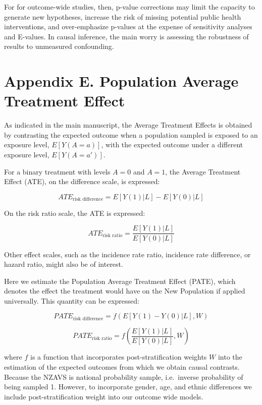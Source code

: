 \documentclass[
  singlecolumn]{report}
\begin{document}
For for outcome-wide studies, then, p-value corrections may limit the
capacity to generate new hypotheses, increase the risk of missing
potential public health interventions, and over-emphasize p-values at
the expense of sensitivity analyses and E-values. In causal inference,
the main worry is assessing the robustness of results to unmeasured
confounding.

\newpage{}

\hypertarget{appendix-e.-population-average-treatment-effect}{%
\section{Appendix E. Population Average Treatment
Effect}\label{appendix-e.-population-average-treatment-effect}}

As indicated in the main manuscript, the Average Treatment Effects is
obtained by contrasting the expected outcome when a population sampled
is exposed to an exposure level, \(E[Y(A = a)]\), with the expected
outcome under a different exposure level, \(E[Y(A=a')]\).

For a binary treatment with levels \(A=0\) and \(A=1\), the Average
Treatment Effect (ATE), on the difference scale, is expressed:

\[ATE_{\text{risk difference}} = E[Y(1)|L] - E[Y(0)|L]\]

On the risk ratio scale, the ATE is expressed:

\[ATE_{\text{risk ratio}} = \frac{E[Y(1)|L]}{E[Y(0)|L]}\]

Other effect scales, such as the incidence rate ratio, incidence rate
difference, or hazard ratio, might also be of interest.

Here we estimate the Population Average Treatment Effect (PATE), which
denotes the effect the treatment would have on the New Population if
applied universally. This quantity can be expressed:

\[PATE_{\text{risk difference}} = f(E[Y(1) - Y(0)|L], W)\]

\[PATE_{\text{risk ratio}} = f\left(\frac{E[Y(1)|L]}{E[Y(0)|L]}, W\right)\]

where \(f\) is a function that incorporates post-stratification weights
\(W\) into the estimation of the expected outcomes from which we obtain
causal contrasts. Because the NZAVS is national probability sample,
i.e.~inverse probability of being sampled 1. However, to incorporate
gender, age, and ethnic differences we include post-stratification
weight into our outcome wide models.
\end{document}
